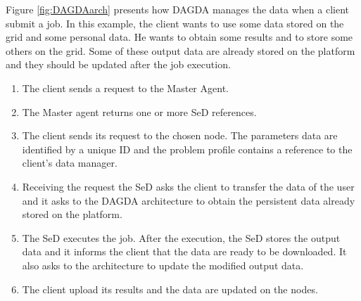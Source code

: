 Figure \ref{fig:DAGDAarch} presents how DAGDA manages the data when a client
submit a job. In this example, the client wants to use some data stored on the
grid and some personal data. He wants to obtain some results and to store
some others on the grid. Some of these output data are already stored on the
platform and they should be updated after the job execution.
\begin{enumerate}
  \item The client sends a request to the Master Agent.
  \item The Master agent returns one or more SeD references.
  \item The client sends its request to the chosen node. The parameters data
    are identified by a unique ID and the problem profile contains a reference
    to the client's data manager.
  \item Receiving the request the SeD asks the client to transfer the data of
    the user and it asks to the DAGDA architecture to obtain the persistent
    data already stored on the platform.
  \item The SeD executes the job. After the execution, the SeD stores the
    output data and it informs the client that the data are ready to be
    downloaded. It also asks to the architecture to update the modified output
    data.
  \item The client upload its results and the data are updated on the nodes.
\end{enumerate}

